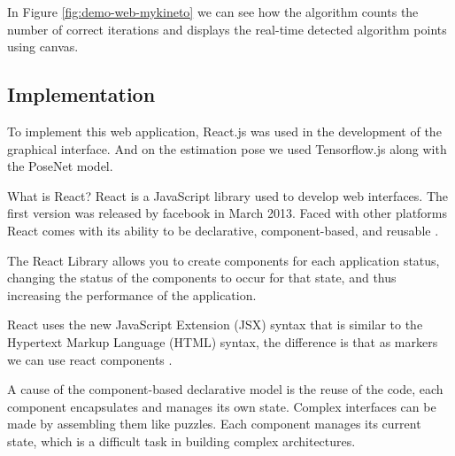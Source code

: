 In Figure \ref{fig:demo-web-mykineto} we can see how the algorithm counts the number of correct iterations and displays the real-time detected algorithm points using canvas.


\subsection{Implementation}

To implement this web application, React.js was used in the development of the graphical interface.
And on the estimation pose we used Tensorflow.js along with the PoseNet model.

What is React? React is a JavaScript library used to develop web interfaces.
The first version was released by facebook in March 2013. Faced with other platforms React comes with
its ability to be declarative, component-based, and reusable \cite{fb-react}.

The React Library allows you to create components for each application status, changing the status of the components to occur for that state, and thus increasing the performance of the application.


React uses the new JavaScript Extension (JSX) syntax that is similar to the Hypertext Markup Language (HTML) syntax, the difference is that as markers we can use react components \cite{jsx-react}.

A cause of the component-based declarative model is the reuse of the code, each component encapsulates and manages its own state. Complex interfaces can be made by assembling them like puzzles. Each component manages its current state, which is a difficult task in building complex architectures.

